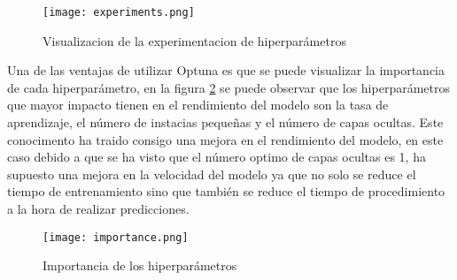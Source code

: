 \begin{figure}[ht]
    \centering
    \texttt{[image: experiments.png]}
    \caption{Visualizacion de la experimentacion de hiperparámetros}
    \label{fig:experiments}
\end{figure}

Una de las ventajas de utilizar Optuna es que se puede visualizar la importancia de cada
hiperparámetro, en la figura \ref{fig:importance} se puede observar que los hiperparámetros
que mayor impacto tienen en el rendimiento del modelo son la tasa de aprendizaje, el número
de instacias pequeñas y el número de capas ocultas. Este conocimento ha traido consigo
una mejora en el rendimiento del modelo, en este caso debido a que se ha visto que el
número optimo de capas ocultas es 1, ha supuesto una mejora en la velocidad del modelo
ya que no solo se reduce el tiempo de entrenamiento sino que también se reduce el tiempo
de procedimiento a la hora de realizar predicciones.

\begin{figure}[ht!]
    \centering
    \texttt{[image: importance.png]}
    \caption{Importancia de los hiperparámetros}
    \label{fig:importance}
\end{figure}
